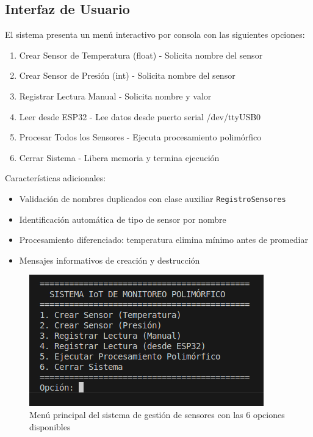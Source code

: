 \documentclass[conference]{IEEEtran}
\begin{document}
\subsection{Interfaz de Usuario}

El sistema presenta un menú interactivo por consola con las siguientes opciones:

\begin{enumerate}
    \item Crear Sensor de Temperatura (float) - Solicita nombre del sensor
    \item Crear Sensor de Presión (int) - Solicita nombre del sensor
    \item Registrar Lectura Manual - Solicita nombre y valor
    \item Leer desde ESP32 - Lee datos desde puerto serial /dev/ttyUSB0
    \item Procesar Todos los Sensores - Ejecuta procesamiento polimórfico
    \item Cerrar Sistema - Libera memoria y termina ejecución
\end{enumerate}

Características adicionales:
\begin{itemize}
    \item Validación de nombres duplicados con clase auxiliar \texttt{RegistroSensores}
    \item Identificación automática de tipo de sensor por nombre
    \item Procesamiento diferenciado: temperatura elimina mínimo antes de promediar
    \item Mensajes informativos de creación y destrucción
\end{itemize}

\begin{figure}[h]
    \centering
    \includegraphics[width=\RelacionFiguradoscolumnas\columnwidth]{menu.png}
    \caption{Menú principal del sistema de gestión de sensores con las 6 opciones disponibles}
    \label{fig:menu}
\end{figure}
\end{document}
